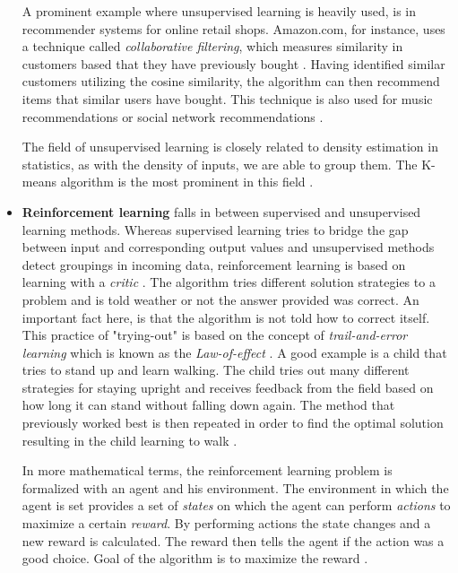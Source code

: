 \begin{itemize}
A prominent example where unsupervised learning is heavily used, is in recommender systems for online retail shops. Amazon.com, for instance, uses a technique called \textit{collaborative filtering}, which measures similarity in customers based that they have previously bought \cite{linden2003amazon}. Having identified similar customers utilizing the cosine similarity, the algorithm can then recommend items that similar users have bought. This technique is also used for music recommendations \cite{perez2017recommender} or social network recommendations \cite{kautz1997referral}.

The field of unsupervised learning is closely related to density estimation in statistics, as with the density of inputs, we are able to group them. The K-means algorithm is the most prominent in this field \cite{Marsland:2009:MLA:1571643}.\\
  
  \item[] \textbf{Reinforcement learning} falls in between supervised and unsupervised learning methods. Whereas supervised learning tries to bridge the gap between input and corresponding output values and unsupervised methods detect groupings in incoming data, reinforcement learning is based on learning with a \textit{critic} \cite{Marsland:2009:MLA:1571643}. The algorithm tries different solution strategies to a problem and is told weather or not the answer provided was correct. An important fact here, is that the algorithm is not told how to correct itself. This practice of "trying-out" is based on the concept of \textit{trail-and-error learning} which is known as the \textit{Law-of-effect} \cite{Marsland:2009:MLA:1571643}. A good example is a child that tries to stand up and learn walking. The child tries out many different strategies for staying upright and receives feedback from the field based on how long it can stand without falling down again. The method that previously worked best is then repeated in order to find the optimal solution resulting in the child learning to walk \cite{Marsland:2009:MLA:1571643}.
  
 In more mathematical terms, the reinforcement learning problem is formalized with an agent and his environment. The environment in which the agent is set provides a set of \textit{states} on which the agent can perform \textit{actions} to maximize a certain \textit{reward}. By performing actions the state changes and a new reward is calculated. The reward then tells the agent if the action was a good choice. Goal of the algorithm is to maximize the reward \cite{Marsland:2009:MLA:1571643}.
 

\end{itemize}
